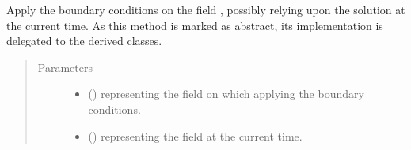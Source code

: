 \documentclass[letterpaper,10pt,english]{sphinxmanual}
\begin{document}
\begin{fulllineitems}
\begin{fulllineitems}
\begin{quote}
\begin{description}
\begin{itemize}
\end{itemize}

\end{description}\end{quote}

\end{fulllineitems}


\begin{fulllineitems}
\label{\detokenize{api:tasmania.dycore.horizontal_boundary.HorizontalBoundary.apply}}
Apply the boundary conditions on the field , possibly relying upon the solution
 at the current time.
As this method is marked as abstract, its implementation is delegated to the derived classes.
\begin{quote}\begin{description}
\item[{Parameters}] \leavevmode\begin{itemize}
\item {} 
 () \textendash{}  representing the field on which applying the boundary conditions.

\item {} 
 () \textendash{}  representing the field at the current time.

\end{itemize}

\end{description}\end{quote}

\end{fulllineitems}



\end{fulllineitems}
\end{document}
